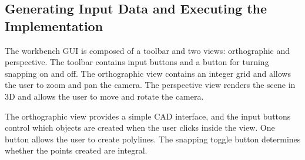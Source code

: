 




% 

% 
  


\subsection{Generating Input Data and Executing the Implementation} 

The workbench GUI is composed of a toolbar and two views: orthographic and
perspective. The toolbar contains input buttons and a button for turning
snapping on and off. The orthographic view contains an integer grid and allows
the user to zoom and pan the camera. The perspective view renders the scene in
3D and allows the user to move and rotate the camera.

The orthographic view provides a simple CAD interface, and the input buttons
control which objects are created when the user clicks inside the view. One
button allows the user to create polylines. The snapping toggle button
determines whether the points created are integral. 

